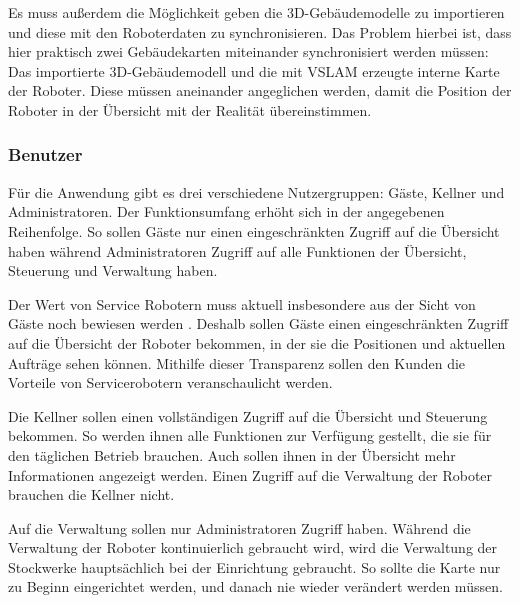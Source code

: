 Es muss außerdem die Möglichkeit geben die 3D-Gebäudemodelle zu importieren und diese mit den Roboterdaten zu synchronisieren. Das Problem hierbei ist, dass hier praktisch zwei Gebäudekarten miteinander synchronisiert werden müssen: Das importierte 3D-Gebäudemodell und die mit \ac{VSLAM} erzeugte interne Karte der Roboter. Diese müssen aneinander angeglichen werden, damit die Position der Roboter in der Übersicht mit der Realität übereinstimmen.

\subsubsection{Benutzer}

Für die Anwendung gibt es drei verschiedene Nutzergruppen: Gäste, Kellner und Administratoren. Der Funktionsumfang erhöht sich in der angegebenen Reihenfolge. So sollen Gäste nur einen eingeschränkten Zugriff auf die Übersicht haben während Administratoren Zugriff auf alle Funktionen der Übersicht, Steuerung und Verwaltung haben.

Der Wert von Service Robotern muss aktuell insbesondere aus der Sicht von Gäste noch bewiesen werden \cite[S.~429]{Paluch2020}. Deshalb sollen Gäste einen eingeschränkten Zugriff auf die Übersicht der Roboter bekommen, in der sie die Positionen und aktuellen Aufträge sehen können. Mithilfe dieser Transparenz sollen den Kunden die Vorteile von Servicerobotern veranschaulicht werden.

Die Kellner sollen einen vollständigen Zugriff auf die Übersicht und Steuerung bekommen. So werden ihnen alle Funktionen zur Verfügung gestellt, die sie für den täglichen Betrieb brauchen. Auch sollen ihnen in der Übersicht mehr Informationen angezeigt werden. Einen Zugriff auf die Verwaltung der Roboter brauchen die Kellner nicht.

Auf die Verwaltung sollen nur Administratoren Zugriff haben. Während die Verwaltung der Roboter kontinuierlich gebraucht wird, wird die Verwaltung der Stockwerke hauptsächlich bei der Einrichtung gebraucht. So sollte die Karte nur zu Beginn eingerichtet werden, und danach nie wieder verändert werden müssen.


